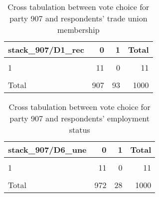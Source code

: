 \documentclass[
]{article}
\begin{document}
\begin{table}

\caption{\label{tab:unnamed-chunk-58}Cross tabulation between vote choice for party 907 and respondents' trade union 
                   membership \label{table:crosstab_4_ee}}
\centering
\begin{tabular}[t]{l|r|r|r}
\hline
stack\_907/D1\_rec & 0 & 1 & Total\\
\hline
\cellcolor{gray!6}{0} & \cellcolor{gray!6}{880} & \cellcolor{gray!6}{92} & \cellcolor{gray!6}{972}\\
\hline
1 & 11 & 0 & 11\\
\hline
\cellcolor{gray!6}{NA} & \cellcolor{gray!6}{16} & \cellcolor{gray!6}{1} & \cellcolor{gray!6}{17}\\
\hline
Total & 907 & 93 & 1000\\
\hline
\end{tabular}
\end{table}

\begin{table}

\caption{\label{tab:unnamed-chunk-58}Cross tabulation between vote choice for party 907 and respondents' employment status 
                  \label{table:crosstab_5_ee}}
\centering
\begin{tabular}[t]{l|r|r|r}
\hline
stack\_907/D6\_une & 0 & 1 & Total\\
\hline
\cellcolor{gray!6}{0} & \cellcolor{gray!6}{945} & \cellcolor{gray!6}{27} & \cellcolor{gray!6}{972}\\
\hline
1 & 11 & 0 & 11\\
\hline
\cellcolor{gray!6}{NA} & \cellcolor{gray!6}{16} & \cellcolor{gray!6}{1} & \cellcolor{gray!6}{17}\\
\hline
Total & 972 & 28 & 1000\\
\hline
\end{tabular}
\end{table}
\end{document}

